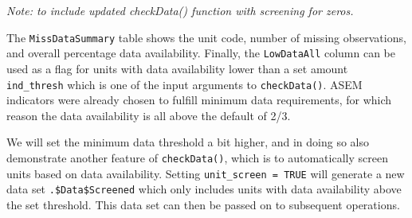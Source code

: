 \documentclass[
]{book}
\newenvironment{Shaded}{\begin{snugshade}}{\end{snugshade}}
\newcommand{\AttributeTok}[1]{\textcolor[rgb]{0.77,0.63,0.00}{#1}}
\newcommand{\CommentTok}[1]{\textcolor[rgb]{0.56,0.35,0.01}{\textit{#1}}}
\newcommand{\ConstantTok}[1]{\textcolor[rgb]{0.00,0.00,0.00}{#1}}
\newcommand{\DocumentationTok}[1]{\textcolor[rgb]{0.56,0.35,0.01}{\textbf{\textit{#1}}}}
\newcommand{\FloatTok}[1]{\textcolor[rgb]{0.00,0.00,0.81}{#1}}
\newcommand{\FunctionTok}[1]{\textcolor[rgb]{0.00,0.00,0.00}{#1}}
\newcommand{\NormalTok}[1]{#1}
\newcommand{\OtherTok}[1]{\textcolor[rgb]{0.56,0.35,0.01}{#1}}
\newcommand{\SpecialCharTok}[1]{\textcolor[rgb]{0.00,0.00,0.00}{#1}}
\newcommand{\StringTok}[1]{\textcolor[rgb]{0.31,0.60,0.02}{#1}}
\begin{document}
\begin{Shaded}
\end{Shaded}

\emph{Note: to include updated checkData() function with screening for zeros.}

The \texttt{MissDataSummary} table shows the unit code, number of missing observations, and overall percentage data availability. Finally, the \texttt{LowDataAll} column can be used as a flag for units with data availability lower than a set amount \texttt{ind\_thresh} which is one of the input arguments to \texttt{checkData()}. ASEM indicators were already chosen to fulfill minimum data requirements, for which reason the data availability is all above the default of 2/3.

We will set the minimum data threshold a bit higher, and in doing so also demonstrate another feature of \texttt{checkData()}, which is to automatically screen units based on data availability. Setting \texttt{unit\_screen\ =\ TRUE} will generate a new data set \texttt{.\$Data\$Screened} which only includes units with data availability above the set threshold. This data set can then be passed on to subsequent operations.

\begin{Shaded}
\end{Shaded}
\end{document}
